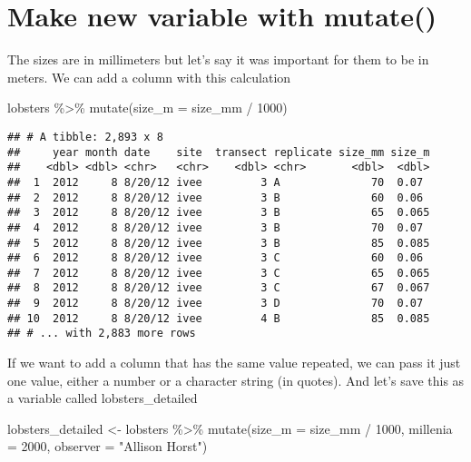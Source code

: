 \documentclass[
]{article}
\newenvironment{Shaded}{\begin{snugshade}}{\end{snugshade}}
\newcommand{\AttributeTok}[1]{\textcolor[rgb]{0.77,0.63,0.00}{#1}}
\newcommand{\DecValTok}[1]{\textcolor[rgb]{0.00,0.00,0.81}{#1}}
\newcommand{\FunctionTok}[1]{\textcolor[rgb]{0.00,0.00,0.00}{#1}}
\newcommand{\NormalTok}[1]{#1}
\newcommand{\OtherTok}[1]{\textcolor[rgb]{0.56,0.35,0.01}{#1}}
\newcommand{\SpecialCharTok}[1]{\textcolor[rgb]{0.00,0.00,0.00}{#1}}
\newcommand{\StringTok}[1]{\textcolor[rgb]{0.31,0.60,0.02}{#1}}
\begin{document}
\hypertarget{make-new-variable-with-mutate}{%
\section{Make new variable with
mutate()}\label{make-new-variable-with-mutate}}

The sizes are in millimeters but let's say it was important for them to
be in meters. We can add a column with this calculation

\begin{Shaded}
\begin{Highlighting}[]
\NormalTok{lobsters }\SpecialCharTok{\%\textgreater{}\%}
  \FunctionTok{mutate}\NormalTok{(}\AttributeTok{size\_m =}\NormalTok{ size\_mm }\SpecialCharTok{/} \DecValTok{1000}\NormalTok{)}
\end{Highlighting}
\end{Shaded}

\begin{verbatim}
## # A tibble: 2,893 x 8
##     year month date    site  transect replicate size_mm size_m
##    <dbl> <dbl> <chr>   <chr>    <dbl> <chr>       <dbl>  <dbl>
##  1  2012     8 8/20/12 ivee         3 A              70  0.07 
##  2  2012     8 8/20/12 ivee         3 B              60  0.06 
##  3  2012     8 8/20/12 ivee         3 B              65  0.065
##  4  2012     8 8/20/12 ivee         3 B              70  0.07 
##  5  2012     8 8/20/12 ivee         3 B              85  0.085
##  6  2012     8 8/20/12 ivee         3 C              60  0.06 
##  7  2012     8 8/20/12 ivee         3 C              65  0.065
##  8  2012     8 8/20/12 ivee         3 C              67  0.067
##  9  2012     8 8/20/12 ivee         3 D              70  0.07 
## 10  2012     8 8/20/12 ivee         4 B              85  0.085
## # ... with 2,883 more rows
\end{verbatim}

If we want to add a column that has the same value repeated, we can pass
it just one value, either a number or a character string (in quotes).
And let's save this as a variable called lobsters\_detailed

\begin{Shaded}
\begin{Highlighting}[]
\NormalTok{lobsters\_detailed }\OtherTok{\textless{}{-}}\NormalTok{ lobsters }\SpecialCharTok{\%\textgreater{}\%}
  \FunctionTok{mutate}\NormalTok{(}\AttributeTok{size\_m =}\NormalTok{ size\_mm }\SpecialCharTok{/} \DecValTok{1000}\NormalTok{, }
         \AttributeTok{millenia =} \DecValTok{2000}\NormalTok{,}
         \AttributeTok{observer =} \StringTok{"Allison Horst"}\NormalTok{)}
\end{Highlighting}
\end{Shaded}
\end{document}
